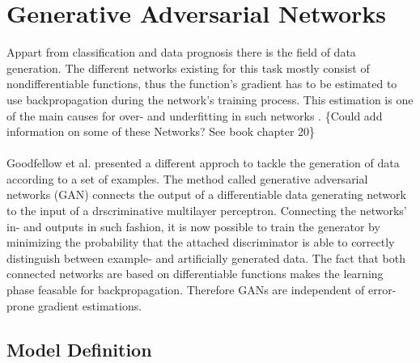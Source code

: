 \section{Generative Adversarial Networks}

Appart from classification and data prognosis there is the field of data generation.
The different networks existing for this task mostly consist of nondifferentiable functions, thus the function's gradient has to be estimated to use backpropagation during the network's training process.
This estimation is one of the main causes for over- and underfitting in such networks \cite{1}.
\{Could add information on some of these Networks? See book chapter 20\}
\\
\\
Goodfellow et al. \cite{1} presented a different approch to tackle the generation of data according to a set of examples.
The method called generative adversarial networks (GAN) connects the output of a differentiable data generating network to the input of a drscriminative multilayer perceptron.
Connecting the networks' in- and outputs in such fashion, it is now possible to train the generator by minimizing the probability that the attached discriminator is able to correctly distinguish between example- and artificially generated data.
The fact that both connected networks are based on differentiable functions makes the learning phase feasable for backpropagation. Therefore GANs are independent of error-prone gradient estimations.


  \subsection{Model Definition}

